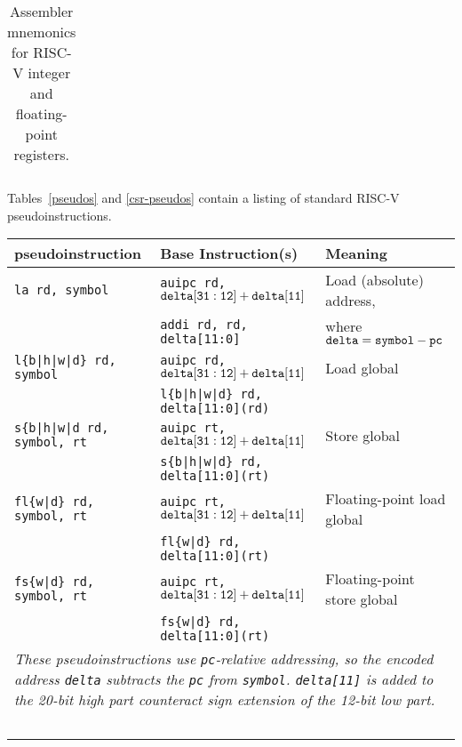 \begin{table*}[htbp]
\begin{center}
\begin{tabular}{|l|l|l|l|}
 \end{tabular}
\end{center}
\caption{Assembler mnemonics for RISC-V integer and floating-point registers.}
\label{regmap}
\end{table*}

Tables~\ref{pseudos} and \ref{csr-pseudos} contain a listing of standard
RISC-V pseudoinstructions.

\begin{table}[h]
\begin{small}
\begin{center}
\begin{tabular}{l l l}
pseudoinstruction & Base Instruction(s) & Meaning \\ \hline

\tt la rd, symbol & {\tt auipc rd, ${\tt delta[31:12]} + {\tt delta[11]}$} & Load (absolute) address, \\
                  & {\tt addi rd, rd, delta[11:0]}                         & where ${\tt delta} = {\tt symbol} - {\tt pc}$ \\[1ex]
\tt l\{b|h|w|d\} rd, symbol & {\tt auipc rd, ${\tt delta[31:12]} + {\tt delta[11]}$} & Load global \\
                            & {\tt l\{b|h|w|d\} rd, delta[11:0](rd)}                 & \\[1ex]
\tt s\{b|h|w|d\ rd, symbol, rt & {\tt auipc rt, ${\tt delta[31:12]} + {\tt delta[11]}$} & Store global \\
                               & {\tt s\{b|h|w|d\} rd, delta[11:0](rt)}                 & \\[1ex]
\tt fl\{w|d\} rd, symbol, rt & {\tt auipc rt, ${\tt delta[31:12]} + {\tt delta[11]}$} & Floating-point load global \\
                             & {\tt fl\{w|d\} rd, delta[11:0](rt)}                    & \\[1ex]
\tt fs\{w|d\} rd, symbol, rt & {\tt auipc rt, ${\tt delta[31:12]} + {\tt delta[11]}$} & Floating-point store global \\
                             & {\tt fs\{w|d\} rd, delta[11:0](rt)}                    & \\[1ex]
\multicolumn{3}{p{.99\textwidth}}{\small \em These pseudoinstructions use {\tt pc}-relative addressing, so the encoded address {\tt delta} subtracts the {\tt pc} from {\tt symbol}.  {\tt delta[11]} is added to the 20-bit high part counteract sign extension of the 12-bit low part.} \\
~\\

\end{tabular}
\end{center}
\end{small}
\end{table}
